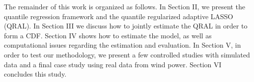The remainder of this work is organized as follows. In Section II, we present the quantile regression framework and the quantile regularized adaptive LASSO (QRAL). In Section III we discuss how to jointly estimate the QRAL in order to form a CDF. Section IV shows how to estimate the model, as well as computational issues regarding the estimation and evaluation. In Section V, in order to test our methodology, we present a few controlled studies with simulated data and a final case study using real data from wind power. Section VI concludes this study.
